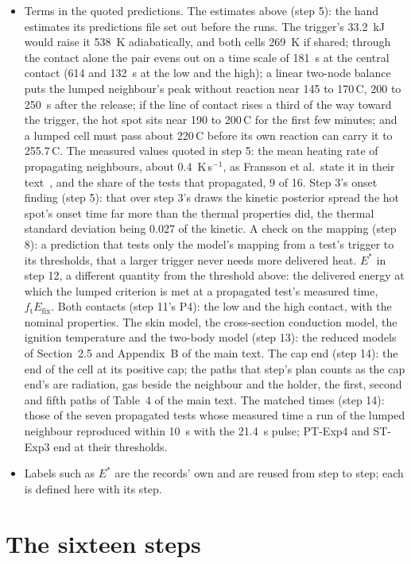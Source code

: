 \documentclass[preprint,12pt]{elsarticle}
\newcommand{\degC}{\,\textdegree C}
\begin{document}
\begin{itemize}
\item Terms in the quoted predictions. The estimates above (step 5): the hand estimates its predictions file set out before the runs. The trigger's 33.2~kJ would raise it 538~K adiabatically, and both cells 269~K if shared; through the contact alone the pair evens out on a time scale of 181~s at the central contact (614 and 132~s at the low and the high); a linear two-node balance puts the lumped neighbour's peak without reaction near 145 to 170\degC, 200 to 250~s after the release; if the line of contact rises a third of the way toward the trigger, the hot spot sits near 190 to 200\degC{} for the first few minutes; and a lumped cell must pass about 220\degC{} before its own reaction can carry it to 255.7\degC. The measured values quoted in step 5: the mean heating rate of propagating neighbours, about 0.4~K\,s$^{-1}$, as Fransson et al.\ state it in their text~\cite{fransson2024exploring}, and the share of the tests that propagated, 9 of 16. Step 3's onset finding (step 5): that over step 3's draws the kinetic posterior spread the hot spot's onset time far more than the thermal properties did, the thermal standard deviation being 0.027 of the kinetic. A check on the mapping (step 8): a prediction that tests only the model's mapping from a test's trigger to its thresholds, that a larger trigger never needs more delivered heat. $E^*$ in step 12, a different quantity from the threshold above: the delivered energy at which the lumped criterion is met at a propagated test's measured time, $f_\mathrm{t}E_\mathrm{fix}$. Both contacts (step 11's P4): the low and the high contact, with the nominal properties. The skin model, the cross-section conduction model, the ignition temperature and the two-body model (step 13): the reduced models of Section~2.5 and Appendix~B of the main text. The cap end (step 14): the end of the cell at its positive cap; the paths that step's plan counts as the cap end's are radiation, gas beside the neighbour and the holder, the first, second and fifth paths of Table~4 of the main text. The matched times (step 14): those of the seven propagated tests whose measured time a run of the lumped neighbour reproduced within 10~s with the 21.4~s pulse; PT-Exp4 and ST-Exp3 end at their thresholds.
\item Labels such as $E^*$ are the records' own and are reused from step to step; each is defined here with its step.
\end{itemize}

\section{The sixteen steps}
\label{sec:s-steps}
\end{document}
